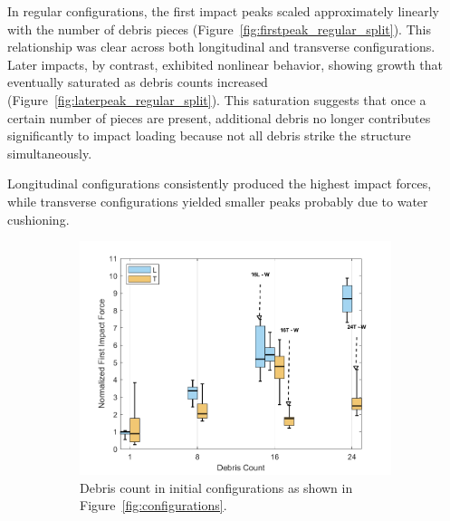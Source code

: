 \documentclass{article}
\begin{document}
{In regular configurations, the first impact peaks scaled approximately linearly with the number of debris pieces (Figure~\ref{fig:firstpeak_regular_split}). This relationship was clear across both longitudinal and transverse configurations. Later impacts, by contrast, exhibited nonlinear behavior, showing growth that eventually saturated as debris counts increased (Figure~\ref{fig:laterpeak_regular_split}). This saturation suggests that once a certain number of pieces are present, additional debris no longer contributes significantly to impact loading because not all debris strike the structure simultaneously.

Longitudinal configurations consistently produced the highest impact forces, while transverse configurations yielded smaller peaks probably due to water cushioning.

\begin{figure}[htbp]
    \centering
    \begin{subfigure}[t]{0.9\textwidth}
        \centering
        \includegraphics[width=\textwidth]{FirstPeak_Regular_SplitByTrial.png}
        \caption{Debris count in initial configurations as shown in Figure~\ref{fig:configurations}.}
        \label{fig:firstpeak_regular_original}
    \end{subfigure}
    \hfill
    \begin{subfigure}[t]{0.9\textwidth}
        \centering

\end{subfigure}
\end{figure}}
\end{document}
